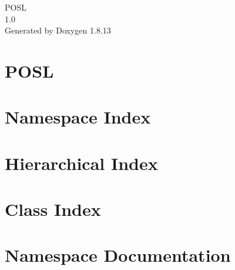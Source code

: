 \documentclass[twoside]{book}
\newcommand{\+}{\discretionary{\mbox{\scriptsize$\hookleftarrow$}}{}{}}
\newcommand{\clearemptydoublepage}{%
  \newpage{\pagestyle{empty}\cleardoublepage}%
}
\begin{document}
\hypersetup{pageanchor=false,
             bookmarksnumbered=true,
             pdfencoding=unicode
            }
\begin{titlepage}
\vspace*{7cm}
\begin{center}%
{\Large P\+O\+SL \\[1ex]\large 1.\+0 }\\
\vspace*{1cm}
{\large Generated by Doxygen 1.8.13}\\
\end{center}
\end{titlepage}
\clearemptydoublepage
{}
\tableofcontents
\clearemptydoublepage
{}
\hypersetup{pageanchor=true}

\chapter{P\+O\+SL}
\label{index}\hypertarget{index}{}
\chapter{Namespace Index}

\chapter{Hierarchical Index}

\chapter{Class Index}

\chapter{Namespace Documentation}





\end{document}
